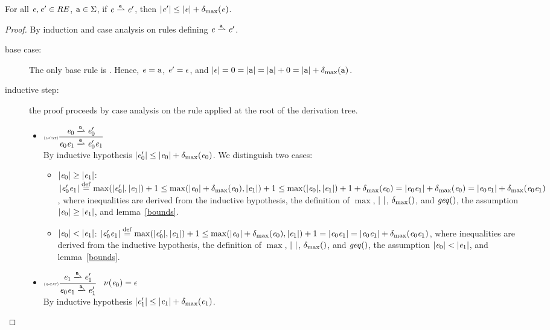 \begin{theorem}\label{inc-bound}
 For all $\mathit {e},\mathit {e}'\in\mathit {RE}$, $\mathtt {a}\in\Sigma$, if $\re\parDer{\sym}\re'$, then ${\mid}{\mathit {e}'}{\mid}\leq {\mid}{\ensuremath{\mathit {e}}}{\mid}+{\delta_{\max}}({\mathit {e}})$.
\end{theorem}
\begin{proof}
 By induction and case analysis on rules defining $\re\parDer{\sym}\re'$.
 \begin{description}
  \item[base case:] The only base rule is .
   Hence, $\mathit {e}=\mathtt {a}$, $\mathit {e}'=\mathtt {\epsilon}$, and
   ${\mid}{\mathtt {\epsilon}}{\mid}=0={\mid}{\mathtt {a}}{\mid}={\mid}{\mathtt {a}}{\mid}+0={\mid}{\mathtt {a}}{\mid}+{\delta_{\max}}({\mathtt {a}})$.
  \item[inductive step:] the proof proceeds by case analysis on the rule applied
   at the root of the derivation tree.
   \begin{itemize}
    \item $\Rule{l-cat}{\re_0\parDer{\sym}\re'_0}{\re_0\catop\re_1\parDer{\sym}\re'_0\catop\re_1}{}$\\[2ex]
          By inductive hypothesis ${\mid}{\mathit {e}_0'}{\mid}\leq {\mid}{\ensuremath{\mathit {e}}_0}{\mid}+{\delta_{\max}}({\mathit {e}_0})$.
          We distinguish two cases:
          \begin{itemize}
           \item ${\mid}{\mathit {e}_0}{\mid}\geq{\mid}{\ensuremath{\mathit {e}}_1}{\mid}$:
                 ${\mid}{\mathit {e}_0'\mathit {e}_1}{\mid}\stackrel{\mathrm{def}}{=}\max({\mid}{\mathit {e}'_0}{\mid},{\mid}{\mathit {e}_1}{\mid})+1\leq\max({\mid}{\mathit {e}_0}{\mid}+{\delta_{\max}}({\mathit {e}_0}),{\mid}{\mathit {e}_1}{\mid})+1\leq\max({\mid}{\mathit {e}_0}{\mid},{\mid}{\mathit {e}_1}{\mid})+1+{\delta_{\max}}({\mathit {e}_0})={\mid}{\mathit {e}_0\mathit {e}_1}{\mid}+{\delta_{\max}}({\mathit {e}_0})={\mid}{\mathit {e}_0\mathit {e}_1}{\mid}+{\delta_{\max}}({\mathit {e}_0\mathit {e}_1})$, where inequalities are derived from the inductive hypothesis, the definition of $\max$, ${\mid}{\ }{\mid}$, ${\delta_{\max}}({})$, and $\mathit{geq}()$, the assumption ${\mid}{\mathit {e}_0}{\mid}\geq{\mid}{\ensuremath{\mathit {e}}_1}{\mid}$, and lemma~\ref{bounds}.

           \item ${\mid}{\mathit {e}_0}{\mid}<{\mid}{\mathit {e}_1}{\mid}$:
                 ${\mid}{\mathit {e}_0'\mathit {e}_1}{\mid}\stackrel{\mathrm{def}}{=}\max({\mid}{\mathit {e}'_0}{\mid},{\mid}{\mathit {e}_1}{\mid})+1\leq\max({\mid}{\mathit {e}_0}{\mid}+{\delta_{\max}}({\mathit {e}_0}),{\mid}{\mathit {e}_1}{\mid})+1={\mid}{\mathit {e}_0\mathit {e}_1}{\mid}={\mid}{\mathit {e}_0\mathit {e}_1}{\mid}+{\delta_{\max}}({\mathit {e}_0\mathit {e}_1})$, where inequalities are derived from the inductive hypothesis, the definition of $\max$, ${\mid}{\ }{\mid}$, ${\delta_{\max}}({})$, and $\mathit{geq}()$, the assumption ${\mid}{\mathit {e}_0}{\mid}<{\mid}{\mathit {e}_1}{\mid}$, and lemma~\ref{bounds}.
          \end{itemize}

    \item $\Rule{r-cat}{\re_1\parDer{\sym}\re'_1}{\re_0\catop\re_1\parDer{\sym}\re'_1}{\hasEps{\re_0}=\eps}$\\[2ex]
          By inductive hypothesis ${\mid}{\mathit {e}_1'}{\mid}\leq {\mid}{\ensuremath{\mathit {e}}_1}{\mid}+{\delta_{\max}}({\mathit {e}_1})$.


\end{itemize}
\end{description}
\end{proof}
